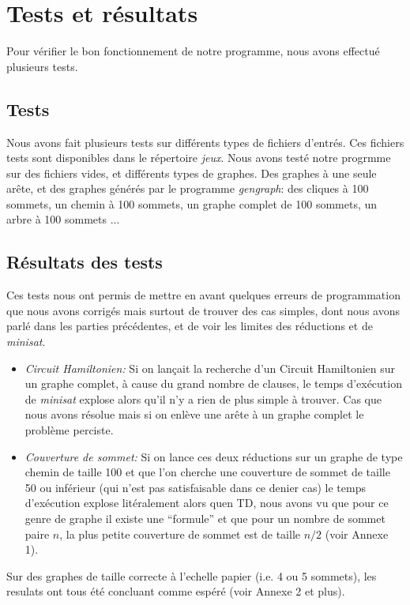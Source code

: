  \section{Tests et résultats}
  Pour vérifier le bon fonctionnement de notre programme, nous avons
  effectué plusieurs tests.
  \subsection{Tests}
  Nous avons fait plusieurs tests sur différents types de fichiers
  d'entrés. Ces fichiers tests sont disponibles dans le répertoire
  \emph{jeux}. Nous avons testé notre progrmme sur des fichiers vides,
  et différents types de graphes. Des graphes à une seule arête, et des
  graphes générés par le programme \emph{gengraph}: des cliques à 100
  sommets, un chemin à 100 sommets, un graphe complet de 100 sommets, un
  arbre à 100 sommets ...
  \subsection{Résultats des tests}
  Ces tests nous ont permis de mettre en avant quelques erreurs de
  programmation que nous avons corrigés mais surtout de trouver des cas
  simples, dont nous avons parlé dans les parties précédentes, et de
  voir les limites des réductions et de \emph{minisat}.\newline
  \begin{itemize}
   \item \emph{Circuit Hamiltonien:} Si on lançait la recherche d'un
	 Circuit Hamiltonien sur un graphe complet, à cause du grand
	 nombre de clauses, le temps d'exécution de \emph{minisat}
	 explose alors qu'il n'y a rien de plus simple à trouver. Cas
	 que nous avons résolue mais si on enlève une arête à un graphe
	 complet le problème perciste.\\
   \item \emph{Couverture de sommet:} Si on lance ces deux
	 réductions sur un graphe de type chemin de taille 100 et que
	 l'on cherche une couverture de sommet de taille 50 ou
	 inférieur (qui n'est pas satisfaisable dans ce denier cas) le
	 temps d'exécution explose litéralement alors quen TD, nous
	 avons vu que pour ce genre de graphe il existe une ``formule''
	 et que pour un nombre de sommet paire $n$, la plus petite
	 couverture de sommet est de taille $n/2$ (voir Annexe 1).
  \end{itemize}
  Sur des graphes de taille correcte à l'echelle papier (i.e. 4 ou 5
  sommets), les resulats ont tous été concluant comme espéré (voir
  Annexe 2 et plus).